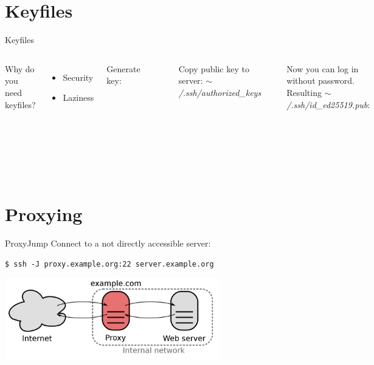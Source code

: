 \documentclass[10pt,graphics,aspectratio=169,table]{beamer}
\begin{document}
\section{Keyfiles}
\begin{frame}[fragile]{Keyfiles}
\begin{columns}
	Why do you need keyfiles?
	\begin{itemize}
		\item Security
		\item Laziness
	\end{itemize}
	Generate key:
	\begin{lstlisting}
$ ssh-keygen -t ed25519 -C me@mypc
	\end{lstlisting}
	\begin{lstlisting}
$ ssh-keygen -b 4096 -t rsa
	\end{lstlisting}
	Copy public key to server: \textit{$\sim$/.ssh/authorized\_keys}
	\begin{lstlisting}
$ ssh-copy-id my@example.com
	\end{lstlisting}
	Now you can log in without password.
	Resulting \textit{$\sim$/.ssh/id\_ed25519.pub}:
	\begin{lstlisting}
ssh-ed25519 AAAAC3NzaC1lZ
DI1NTE5AAAAIJDzhzcMdEg7Nz
wwgB0bdOP1pDSKv5fsN4l4q8Y
ysLLX viktor@nerd101
	\end{lstlisting}
\end{columns}
\end{frame}

\section{Proxying}
\begin{frame}[fragile]{ProxyJump}
	Connect to a not directly accessible server:
	\begin{lstlisting}
$ ssh -J proxy.example.org:22 server.example.org
	\end{lstlisting}
	\begin{center}
		\includegraphics[width=0.7\textwidth]{img/proxy.png} \cite{proxy}
	\end{center}
\end{frame}
\end{document}
